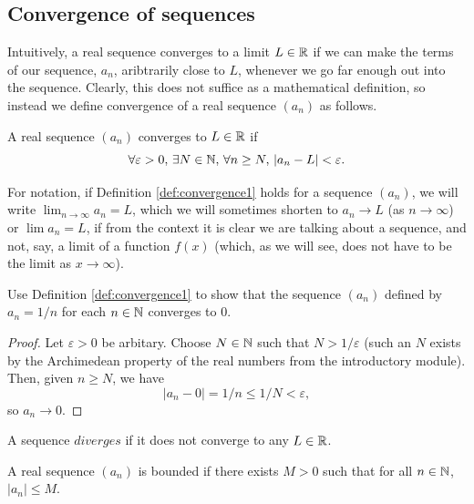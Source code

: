 \documentclass[../analysis1.tex]{subfiles}
\begin{document}
\subsection{Convergence of sequences}
Intuitively, a real sequence converges to a limit $L\in\mathbb{R}$ if we can make the terms of our sequence, $a_n$, aribtrarily close to $L$, whenever we go far enough out into the sequence.
Clearly, this does not suffice as a mathematical definition, so instead we define convergence of a real sequence $(a_n)$ as follows.
\begin{definition}
\label{def:convergence1}
    \begin{shaded*}
        A real sequence $(a_n)$ converges to $L\in\mathbb{R}$ if $$\forall\varepsilon>0,\,\exists N\in\mathbb{N},\, \forall n\ge N,\, |a_n-L|<\varepsilon.$$
    \end{shaded*}
\end{definition}
For notation, if Definition \ref{def:convergence1} holds for a sequence $(a_n)$, we will write $\lim_{n\to\infty}a_n=L$, which we will sometimes shorten to $a_n\to L$ (as $n\to\infty$) or $\lim a_n=L$, if from the context it is clear we are talking about a sequence, and not, say, a limit of a function $f(x)$ (which, as we will see, does not have to be the limit as $x\to\infty$).

\begin{example}
    Use Definition \ref{def:convergence1} to show that the sequence $(a_n)$ defined by $a_n=1/n$ for each $n\in\mathbb{N}$ converges to $0$.
\end{example}
\begin{proof}
    Let $\varepsilon>0$ be arbitary. Choose $N\in\mathbb{N}$ such that $N>1/\varepsilon$ (such an $N$ exists by the Archimedean property of the real numbers from the introductory module).
    Then, given $n\ge N$, we have $$|a_n-0|=1/n\le 1/N<\varepsilon,$$so $a_n\to 0$.\qedhere
\end{proof}

\begin{definition}
    \begin{shaded*}
        A sequence $diverges$ if it does not converge to any $L\in\mathbb{R}$.
    \end{shaded*}
\end{definition}

\begin{definition}
    \begin{shaded*}
        A real sequence $(a_n)$ is bounded if there exists $M>0$ such that for all $n\in \mathbb{N}$, $|a_n|\le M$.
    \end{shaded*}
\end{definition}
\end{document}
